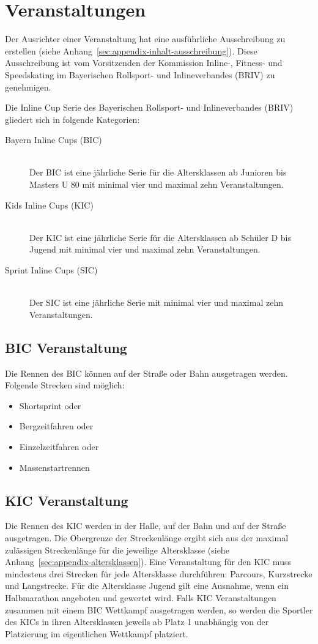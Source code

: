 \section{Veranstaltungen}
Der Ausrichter einer Veranstaltung hat eine ausführliche Ausschreibung zu erstellen (siehe Anhang~\ref{sec:appendix-inhalt-ausschreibung}). Diese Ausschreibung ist vom Vorsitzenden der Kommission Inline-, Fitness- und Speedskating im Bayerischen Rollsport- und Inlineverbandes (BRIV) zu genehmigen.

Die Inline Cup Serie des Bayerischen Rollsport- und Inlineverbandes (BRIV) gliedert sich in folgende Kategorien:

\begin{description}
	\item[Bayern Inline Cups (BIC)] \hfill \\
	Der BIC ist eine jährliche Serie für die Altersklassen ab Junioren bis Masters U 80 mit minimal vier und maximal zehn Veranstaltungen.
	\item[Kids Inline Cups (KIC)] \hfill \\
	Der KIC ist eine jährliche Serie für die Altersklassen ab Schüler D bis Jugend mit minimal vier und maximal zehn Veranstaltungen.
	\item[Sprint Inline Cups (SIC)] \hfill \\
	Der SIC ist eine jährliche Serie mit minimal vier und maximal zehn Veranstaltungen.
\end{description}

\subsection{BIC Veranstaltung}
\label{subsec:bic-veranstaltung}
Die Rennen des BIC können auf der Straße oder Bahn ausgetragen werden. Folgende Strecken sind möglich:
\begin{itemize}
	\item Shortsprint oder
	\item Bergzeitfahren oder
	\item Einzelzeitfahren oder
	\item Massenstartrennen
\end{itemize}

\subsection{KIC Veranstaltung}
Die Rennen des KIC werden in der Halle, auf der Bahn und auf der Straße ausgetragen. Die Obergrenze der Streckenlänge ergibt sich aus der maximal zulässigen Streckenlänge für die jeweilige Altersklasse (siehe Anhang~\ref{sec:appendix-altersklassen}). Eine Veranstaltung für den KIC muss mindestens drei Strecken für jede Altersklasse durchführen: Parcours, Kurzstrecke und Langstrecke. Für die Altersklasse Jugend gilt eine Ausnahme, wenn ein Halbmarathon angeboten und gewertet wird. Falls KIC Veranstaltungen zusammen mit einem BIC Wettkampf ausgetragen werden, so werden die Sportler des KICs in ihren Altersklassen jeweils ab Platz 1 unabhängig von der Platzierung im eigentlichen Wettkampf platziert.

